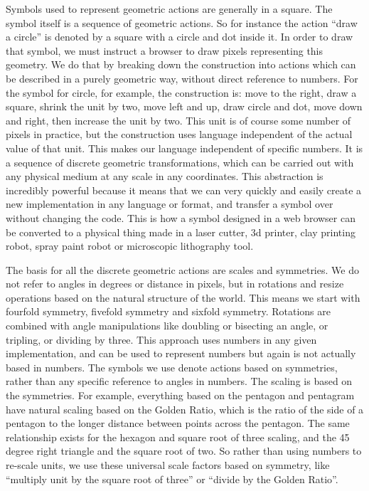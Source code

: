 Symbols used to represent geometric actions are generally in a square.
The symbol itself is a sequence of geometric actions. So for instance
the action ``draw a circle'' is denoted by a square with a circle and
dot inside it. In order to draw that symbol, we must instruct a browser
to draw pixels representing this geometry. We do that by breaking down
the construction into actions which can be described in a purely
geometric way, without direct reference to numbers. For the symbol for
circle, for example, the construction is: move to the right, draw a
square, shrink the unit by two, move left and up, draw circle and dot,
move down and right, then increase the unit by two. This unit is of
course some number of pixels in practice, but the construction uses
language independent of the actual value of that unit. This makes our
language independent of specific numbers. It is a sequence of discrete
geometric transformations, which can be carried out with any physical
medium at any scale in any coordinates. This abstraction is incredibly
powerful because it means that we can very quickly and easily create a
new implementation in any language or format, and transfer a symbol over
without changing the code. This is how a symbol designed in a web
browser can be converted to a physical thing made in a laser cutter, 3d
printer, clay printing robot, spray paint robot or microscopic
lithography tool.

The basis for all the discrete geometric actions are scales and
symmetries. We do not refer to angles in degrees or distance in pixels,
but in rotations and resize operations based on the natural structure of
the world. This means we start with fourfold symmetry, fivefold symmetry
and sixfold symmetry. Rotations are combined with angle manipulations
like doubling or bisecting an angle, or tripling, or dividing by three.
This approach uses numbers in any given implementation, and can be used
to represent numbers but again is not actually based in numbers. The
symbols we use denote actions based on symmetries, rather than any
specific reference to angles in numbers. The scaling is based on the
symmetries. For example, everything based on the pentagon and pentagram
have natural scaling based on the Golden Ratio, which is the ratio of
the side of a pentagon to the longer distance between points across the
pentagon. The same relationship exists for the hexagon and square root
of three scaling, and the 45 degree right triangle and the square root
of two. So rather than using numbers to re-scale units, we use these
universal scale factors based on symmetry, like ``multiply unit by the
square root of three'' or ``divide by the Golden Ratio''.


